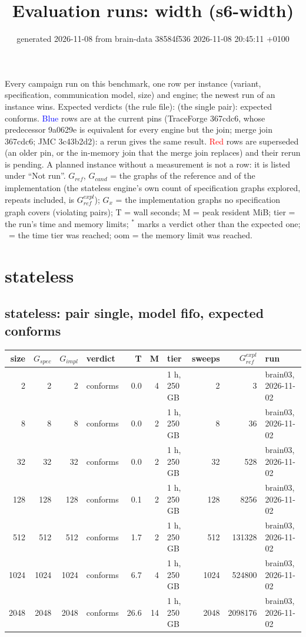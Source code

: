 \documentclass[10pt]{article}
\title{Evaluation runs: \textsf{width} (s6-width)}
\author{}
\date{generated 2026-11-08 from brain-data 38584f536 2026-11-08 20:45:11 +0100}
\begin{document}
\maketitle\small
\noindent Every campaign run on this benchmark, one row per instance (variant, specification, communication model, size) and engine; the newest run of an instance wins. Expected verdicts (the rule file): (the single pair): expected conforms. \textcolor{blue}{Blue} rows are at the current pins (TraceForge 367cdc6, whose predecessor 9a0629e is equivalent for every engine but the join; merge join 367cdc6; JMC 3c43b2d2): a rerun gives the same result. \textcolor{red}{Red} rows are superseded (an older pin, or the in-memory join that the merge join replaces) and their rerun is pending. A planned instance without a measurement is not a row: it is listed under ``Not run''. $G_{\mathit{ref}}$, $G_{\mathit{cand}}$ = the graphs of the reference and of the implementation (the stateless engine's own count of specification graphs explored, repeats included, is $G_{\mathit{ref}}^{\mathit{expl}}$); $G_x$ = the implementation graphs no specification graph covers (violating pairs); T = wall seconds; M = peak resident MiB; tier = the run's time and memory limits; $^{\ast}$ marks a verdict other than the expected one; \faClock\ = the time tier was reached; oom = the memory limit was reached.

\section*{stateless}
\subsection*{stateless: pair \textsf{single}, model fifo, expected conforms}
\begin{longtable}{@{}rrrlrrlrrl@{}}
\toprule
size & $G_{\mathit{spec}}$ & $G_{\mathit{impl}}$ & verdict & T & M & tier & sweeps & $G_{\mathit{ref}}^{\mathit{expl}}$ & run \\
\midrule
\endhead
\color{blue} 2 & 2 & 2 & conforms & 0.0 & 4 & 1 h, 250 GB & 2 & 3 & brain03, 2026-11-02 \\
\color{blue} 8 & 8 & 8 & conforms & 0.0 & 2 & 1 h, 250 GB & 8 & 36 & brain03, 2026-11-02 \\
\color{blue} 32 & 32 & 32 & conforms & 0.0 & 2 & 1 h, 250 GB & 32 & 528 & brain03, 2026-11-02 \\
\color{blue} 128 & 128 & 128 & conforms & 0.1 & 2 & 1 h, 250 GB & 128 & 8256 & brain03, 2026-11-02 \\
\color{blue} 512 & 512 & 512 & conforms & 1.7 & 2 & 1 h, 250 GB & 512 & 131328 & brain03, 2026-11-02 \\
\color{blue} 1024 & 1024 & 1024 & conforms & 6.7 & 4 & 1 h, 250 GB & 1024 & 524800 & brain03, 2026-11-02 \\
\color{blue} 2048 & 2048 & 2048 & conforms & 26.6 & 14 & 1 h, 250 GB & 2048 & 2098176 & brain03, 2026-11-02 \\
\bottomrule
\end{longtable}
\end{document}
